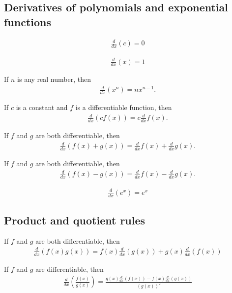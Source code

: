 \documentclass{article}
\begin{document}
\subsection{Derivatives of polynomials and exponential functions}
\begin{theorem}
	\begin{align*}
		\frac{d}{dx}(c) = 0
	\end{align*}
\end{theorem}
\begin{theorem}
	\begin{align*}
		\frac{d}{dx}(x) = 1
	\end{align*}
\end{theorem}
\begin{theorem}
	If $n$ is any real number, then
	\begin{align*}
		\frac{d}{dx}(x^n) = nx^{n-1}.
	\end{align*}
\end{theorem}
\begin{theorem}
	If $c$ is a constant and $f$ is a differentiable function, then
	\begin{align*}
		\frac{d}{dx}(cf(x))=c\frac{d}{dx}f(x).
	\end{align*}
\end{theorem}
\begin{theorem}
	If $f$ and $g$ are both differentiable, then
	\begin{align*}
		\frac{d}{dx}(f(x)+g(x))=\frac{d}{dx}f(x)+\frac{d}{dx}g(x).
	\end{align*}
\end{theorem}
\begin{theorem}
	If $f$ and $g$ are both differentiable, then
	\begin{align*}
		\frac{d}{dx}(f(x)-g(x))=\frac{d}{dx}f(x)-\frac{d}{dx}g(x).
	\end{align*}
\end{theorem}
\begin{theorem}
	\begin{align*}
		\frac{d}{dx}(e^x)=e^x
	\end{align*}
\end{theorem}
\subsection{Product and quotient rules}
\begin{theorem}
	If $f$ and $g$ are both differentiable, then
	\begin{align*}
		\frac{d}{dx}(f(x)g(x))=f(x)\frac{d}{dx}(g(x))+g(x)\frac{d}{dx}(f(x))
	\end{align*}
\end{theorem}
\begin{theorem}
	If $f$ and $g$ are differentiable, then
	\begin{align*}
		\frac{d}{dx}\left(\frac{f(x)}{g(x)}\right)=\frac{g(x)\frac{d}{dx}(f(x))-f(x)\frac{d}{dx}(g(x))}{(g(x))^2}
	\end{align*}
\end{theorem}
\end{document}
